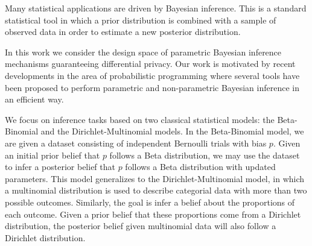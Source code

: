 \documentclass{article}
\begin{document}
Many statistical applications are driven by Bayesian inference.
This is a standard statistical tool in which a prior distribution is combined
with a sample of observed data in order to estimate a new posterior distribution.






In this work we consider the design space of  parametric Bayesian
inference mechanisms guaranteeing differential privacy. Our work is
motivated by recent developments in the area of probabilistic
programming where several tools have been proposed to perform
parametric and non-parametric Bayesian inference in an efficient
way.






We focus on inference tasks based on two classical statistical models: the Beta-Binomial and the
Dirichlet-Multinomial models. In the Beta-Binomial model, we are given a
dataset consisting of independent Bernoulli trials with bias $p$. Given an initial
prior belief that $p$ follows a Beta distribution, we may use the dataset to infer a
posterior belief that $p$ follows a Beta distribution with updated parameters. This model
generalizes to the Dirichlet-Multinomial model, in which a multinomial distribution
is used to describe categorial data with more than two possible outcomes. Similarly, the goal
is infer a belief about the proportions of each outcome. Given a prior belief that these proportions
come from a Dirichlet distribution, the posterior belief given multinomial data will
also follow a Dirichlet distribution.
\end{document}
